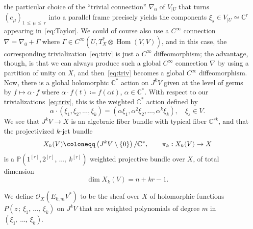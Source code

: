 \documentclass[AHL,Unicode,longabstracts,published]{cedram}
\DeclareMathOperator{\Hom}{Hom}
\newcommand*\cO{\mathcal{O}}
\newcommand*\bC{\mathbb{C}}
\newcommand*\bP{\mathbb{P}}
\let\leq\leqslant
\newcommand*\bydef{\coloneqq}
\begin{document}
the particular choice of the ``trivial connection'' $\nabla_0$ of $V_{|U}$ that turns $(e_\mu)_{1\,\leq\,\mu\,\leq\,r}$ into a parallel frame precisely yields the components $\xi_s\in V_{|U}\simeq\bC^r$ appearing in~\eqref{eq:Taylor}. We could of course also use a $C^\infty$ connection $\nabla=\nabla_0+\Gamma$ where
$\Gamma\in C^\infty(U,T^*_X\otimes\Hom(V,V))$, and in this case, the corresponding trivialization~\eqref{eq:triv} is just a
$C^\infty$ diffeomorphism; the advantage, though, is that we can always produce such a global $C^\infty$ connection $\nabla$ by using a partition of unity on $X$, and then~\eqref{eq:triv} becomes a global $C^\infty$ diffeomorphism. Now, there is a global holomorphic $\bC^*$ action on $J^kV$ given at the level of germs by $f\mapsto\alpha\cdot f$ where $\alpha\cdot f(t)\bydef f(\alpha t)$,
$\alpha\in\bC^*$. With respect to our trivializations~\eqref{eq:triv}, this is the weighted $\bC^*$ action defined by
\[
\alpha\cdot(\xi_1,\xi_2,\dotsc,\xi_k)=\left(\alpha\xi_1,
\alpha^2\xi_2,\dotsc,\alpha^k\xi_k\right),\quad \xi_s\in V.
\]
We see that $J^kV\to X$ is an algebraic fiber bundle with typical fiber $\bC^{rk}$, and that the projectivized $k$-jet bundle
\[
X_k(V)
\bydef \left(J^kV\setminus\{0\}\right)/\bC^*,\qquad \pi_k:\smash{X_k(V)}\to X
\]
is a $\bP(1^{[r]},2^{[r]},\,\dotsc,\,k^{[r]})$ weighted projective bundle over $X$, of total dimension
\[
\dim X_k(V)=n+kr-1.
\]

\begin{defi}
We define $\cO_X(E_{k,m} V^*)$ to be the sheaf over $X$ of holomorphic functions $P(z\,;\,\xi_1,\,\dotsc,\,\xi_k)$ on $J^kV$ that are weighted polynomials of degree $m$ in $(\xi_1,\,\dotsc,\,\xi_k)$.
\end{defi}
\end{document}
